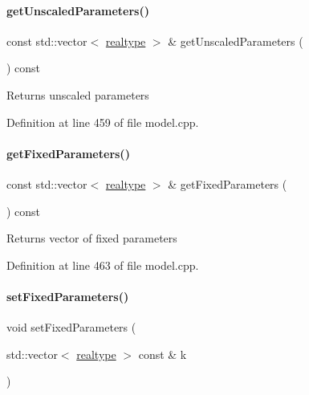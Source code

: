 \paragraph{\texorpdfstring{get\+Unscaled\+Parameters()}{getUnscaledParameters()}}
{\footnotesize\ttfamily const std\+::vector$<$ \mbox{\hyperlink{namespaceamici_a1bdce28051d6a53868f7ccbf5f2c14a3}{realtype}} $>$ \& get\+Unscaled\+Parameters (\begin{DoxyParamCaption}{ }\end{DoxyParamCaption}) const}

\begin{DoxyReturn}{Returns}
unscaled parameters 
\end{DoxyReturn}


Definition at line 459 of file model.\+cpp.

\mbox{\label{classamici_1_1_model_a76b24282a74eaca67d656149310dc07c}} 
\paragraph{\texorpdfstring{get\+Fixed\+Parameters()}{getFixedParameters()}}
{\footnotesize\ttfamily const std\+::vector$<$ \mbox{\hyperlink{namespaceamici_a1bdce28051d6a53868f7ccbf5f2c14a3}{realtype}} $>$ \& get\+Fixed\+Parameters (\begin{DoxyParamCaption}{ }\end{DoxyParamCaption}) const}

\begin{DoxyReturn}{Returns}
vector of fixed parameters 
\end{DoxyReturn}


Definition at line 463 of file model.\+cpp.

\mbox{\label{classamici_1_1_model_a14ba63ae81b4e8fa1f46884b703e2c30}} 
\paragraph{\texorpdfstring{set\+Fixed\+Parameters()}{setFixedParameters()}}
{\footnotesize\ttfamily void set\+Fixed\+Parameters (\begin{DoxyParamCaption}\item[{std\+::vector$<$ \mbox{\hyperlink{namespaceamici_a1bdce28051d6a53868f7ccbf5f2c14a3}{realtype}} $>$ const \&}]{k }\end{DoxyParamCaption})}



